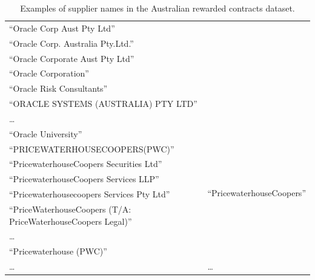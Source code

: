 \documentclass[1p,12pt]{elsarticle}
\begin{document}
\begin{table}[!htb]
\begin{center}
\begin{tabular}{|p{8cm}|p{7.5cm}|}
  ``Oracle Corp Aust Pty Ltd'' & \\
  ``Oracle Corp. Australia Pty.Ltd.'' & \\
  ``Oracle Corporate Aust Pty Ltd'' & \\
  ``Oracle Corporation'' & \\
  ``Oracle Risk Consultants'' & \\
  ``ORACLE SYSTEMS (AUSTRALIA) PTY LTD'' & \\
  \ldots  & \\
  ``Oracle University''  & \\ \hline
  ``PRICEWATERHOUSECOOPERS(PWC)''  & \multirow{6}{*}{``PricewaterhouseCoopers''} \\
  ``PricewaterhouseCoopers Securities Ltd''& \multirow{6}{*}{\scriptsize\url{http://dbpedia.org/resource/PricewaterhouseCoopers}} \\
  ``PricewaterhouseCoopers Services LLP'' & \\
  ``Pricewaterhousecoopers Services Pty Ltd'' & \\
  ``PriceWaterhouseCoopers (T/A: PriceWaterhouseCoopers Legal)'' & \\
  \ldots  & \\
  ``Pricewaterhouse (PWC)'' & \\ \hline
  \ldots & \ldots \\
  \hline
  \end{tabular}
  \caption{Examples of supplier names in the Australian rewarded contracts dataset.}
  \label{tabla:aus-suppliers}
  \end{center}
\end{table} 
\end{document}
